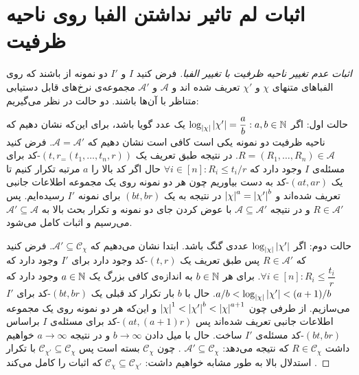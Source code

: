 \chapter{اثبات لم تاثیر نداشتن الفبا روی ناحیه ظرفیت}
\label{appendix:l1}

\begin{proof}[اثبات عدم تغییر ناحیه ظرفیت با تغییر الفبا]
	فرض کنید
	$I$
	و
	$I'$
	دو نمونه از 
	\icod
	باشند که روی الفباهای متنهای
	$\chi$
	و
	$\chi'$
	تعریف شده اند و
	$\mathscr{A}$
	و
	$ \mathscr{A}'$
	مجموعه‌ی نرخ‌های قابل دستیابی متناظر با آن‌ها باشند.
	دو حالت در نظر می‌گیریم:
	
	حالت اول: اگر
	$\log_{\left|{\chi}\right|} \left|{\chi'}\right| = \dfrac{a}{b}: a, b \in \mathbb{N}$
	یک عدد گویا باشد، برای این‌که نشان دهیم که ناحیه ظرفیت دو نمونه یکی است کافی است نشان دهیم که
	$\mathscr{A} = \mathscr{A}'$.
 فرض کنید
	$R = (R_1, \ldots, R_n) \in \mathscr{A}$.
 در نتیجه طبق تعریف یک 
	$(t, r_ = (t_1, \ldots, t_n, r))$-کد
	برای مسئله‌ی
	$I$
	وجود دارد که
	$\forall i \in [n]: R_i \leq t_i / r$
	حال اگر کد بالا را
	$a$
	مرتبه تکرار کنیم تا یک
	$(at, ar)$-کد
	به دست بیاوریم چون هر دو نمونه روی یک مجموعه اطلاعات جانبی تعریف شده‌اند و 
	$\left|{\chi}\right|^a = \left|{\chi'}\right|^b$
	در نتیجه به یک
	$(bt, br)$
	برای نمونه
	$I'$
	رسیده‌ایم. پس
	$R \in \mathscr{A}'$
	و در نتیجه
	$\mathscr{A} \subseteq \mathscr{A}'$
	با عوض کردن جای دو نمونه و تکرار بحث بالا به
		$\mathscr{A}' \subseteq \mathscr{A}$
		می‌رسیم و اثبات کامل می‌شود.
		
		حالت دوم: اگر
		$\log_{\left|{\chi}\right|} \left|{\chi'}\right| $
		عددی گنگ باشد. ابتدا نشان می‌دهیم که
		$\mathscr{A}' \subseteq \mathscr{C}_{\chi}$.
  فرض کنید که
		$R \in \mathscr{A}'$
		پس طبق تعریف یک
		$(t, r)$-کد
		وجود دارد برای
		$I'$
		وجود دارد که
		$\forall i \in [n]: R_i \leq \dfrac{t_i}{r}$.
  برای هر
		$b \in \mathbb{N}$
		به اندازه‌ی کافی بزرگ یک
		$a \in \mathbb{N}$
		وجود دارد که
		$a/b < \log_{\left|{\chi}\right|} \left|{\chi'}\right| < (a+1)/b$.
  حال با
		$b$
		بار تکرار کد قبلی یک 
		$(bt, br)$-کد
		برای
		$I'$
		می‌سازیم. از طرفی چون
		$\left|{\chi}\right|^1 < \left|{\chi'}\right|^b < \left|{\chi}\right|^{a + 1}$
		و این‌که هر دو نمونه روی یک مجموعه اطلاعات جانبی تعریف شده‌اند پس
		$(at, (a+1)r)$-کد
		برای مسئله‌ی
		$I$
		براساس
		$(bt, br)$-کد
		 مسئله‌ی
		 $I'$
		 ساخت. حال با میل دادن
		 $b \rightarrow \infty$
		 و در نتیجه
		 $a \rightarrow \infty$
		 خواهیم داشت
		 $R \in \mathscr{C}_{\chi}$
		  که نتیجه می‌دهد:
		  $\mathscr{A}' \subseteq \mathscr{C}_{\chi}$
		  . چون
		  $\mathscr{C}_{\chi}$
		  بسته است پس
		  $\mathscr{C}_{\chi'} \subseteq \mathscr{C}_{\chi}$
		  با تکرار استدلال بالا به طور مشابه خواهیم داشت:
		  $\mathscr{C}_{\chi} \subseteq \mathscr{C}_{\chi'}$
		  که اثبات را کامل می‌کند \cite{fatemehbook}.
\end{proof}

